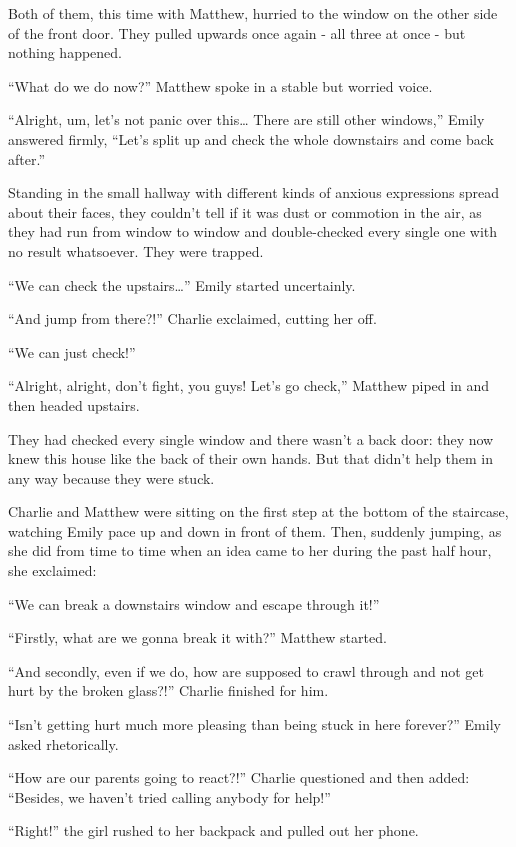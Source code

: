 Both of them, this time with Matthew, hurried to the window on the other side of the front door. They pulled upwards once again - all three at once - but nothing happened.

“What do we do now?” Matthew spoke in a stable but worried voice.

“Alright, um, let's not panic over this… There are still other windows,” Emily answered firmly, “Let's split up and check the whole downstairs and come back after.”

\bigskip

Standing in the small hallway with different kinds of anxious expressions spread about their faces, they couldn't tell if it was dust or commotion in the air, as they had run from window to window and double-checked every single one with no result whatsoever. They were trapped.

“We can check the upstairs…” Emily started uncertainly.

“And jump from there?!” Charlie exclaimed, cutting her off.

“We can just check!”

“Alright, alright, don't fight, you guys! Let's go check,” Matthew piped in and then headed upstairs.

\bigskip

They had checked every single window and there wasn't a back door: they now knew this house like the back of their own hands. But that didn't help them in any way because they were stuck.

Charlie and Matthew were sitting on the first step at the bottom of the staircase, watching Emily pace up and down in front of them. Then, suddenly jumping, as she did from time to time when an idea came to her during the past half hour, she exclaimed:

“We can break a downstairs window and escape through it!”

“Firstly, what are we gonna break it with?” Matthew started.

“And secondly, even if we do, how are supposed to crawl through and not get hurt by the broken glass?!” Charlie finished for him.

“Isn't getting hurt much more pleasing than being stuck in here forever?” Emily asked rhetorically.

“How are our parents going to react?!” Charlie questioned and then added: “Besides, we haven't tried calling anybody for help!”

“Right!” the girl rushed to her backpack and pulled out her phone.

